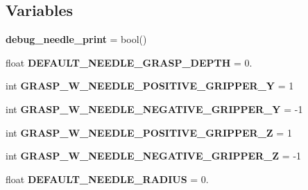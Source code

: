 \subsection*{Variables}
\begin{DoxyCompactItemize}
\item 
{\bfseries debug\+\_\+needle\+\_\+print} = bool(\textquotesingle{}\textquotesingle{})\hypertarget{namespaceneedle__planner__camera__working_ac4a4bbeda008998958ad58628672129e}{}\label{namespaceneedle__planner__camera__working_ac4a4bbeda008998958ad58628672129e}

\item 
float {\bfseries D\+E\+F\+A\+U\+L\+T\+\_\+\+N\+E\+E\+D\+L\+E\+\_\+\+G\+R\+A\+S\+P\+\_\+\+D\+E\+P\+TH} = 0.\hypertarget{namespaceneedle__planner__camera__working_ad7cf879208934ac313d29e98ba9e300e}{}\label{namespaceneedle__planner__camera__working_ad7cf879208934ac313d29e98ba9e300e}

\item 
int {\bfseries G\+R\+A\+S\+P\+\_\+\+W\+\_\+\+N\+E\+E\+D\+L\+E\+\_\+\+P\+O\+S\+I\+T\+I\+V\+E\+\_\+\+G\+R\+I\+P\+P\+E\+R\+\_\+Y} = 1\hypertarget{namespaceneedle__planner__camera__working_a82ed200a7602cd5a642ff337d8539ae8}{}\label{namespaceneedle__planner__camera__working_a82ed200a7602cd5a642ff337d8539ae8}

\item 
int {\bfseries G\+R\+A\+S\+P\+\_\+\+W\+\_\+\+N\+E\+E\+D\+L\+E\+\_\+\+N\+E\+G\+A\+T\+I\+V\+E\+\_\+\+G\+R\+I\+P\+P\+E\+R\+\_\+Y} = -\/1\hypertarget{namespaceneedle__planner__camera__working_a04874c13b30a30d19ddfa28aecc0f90b}{}\label{namespaceneedle__planner__camera__working_a04874c13b30a30d19ddfa28aecc0f90b}

\item 
int {\bfseries G\+R\+A\+S\+P\+\_\+\+W\+\_\+\+N\+E\+E\+D\+L\+E\+\_\+\+P\+O\+S\+I\+T\+I\+V\+E\+\_\+\+G\+R\+I\+P\+P\+E\+R\+\_\+Z} = 1\hypertarget{namespaceneedle__planner__camera__working_afcf30f247c7e7e20f1ed8c57afee3b5c}{}\label{namespaceneedle__planner__camera__working_afcf30f247c7e7e20f1ed8c57afee3b5c}

\item 
int {\bfseries G\+R\+A\+S\+P\+\_\+\+W\+\_\+\+N\+E\+E\+D\+L\+E\+\_\+\+N\+E\+G\+A\+T\+I\+V\+E\+\_\+\+G\+R\+I\+P\+P\+E\+R\+\_\+Z} = -\/1\hypertarget{namespaceneedle__planner__camera__working_a53fc3c8a5e921d3e0c2f6fe281d02c7c}{}\label{namespaceneedle__planner__camera__working_a53fc3c8a5e921d3e0c2f6fe281d02c7c}

\item 
float {\bfseries D\+E\+F\+A\+U\+L\+T\+\_\+\+N\+E\+E\+D\+L\+E\+\_\+\+R\+A\+D\+I\+US} = 0.\hypertarget{namespaceneedle__planner__camera__working_a3ca7c28d351d5ec2d911bda3bf8b0916}{}\label{namespaceneedle__planner__camera__working_a3ca7c28d351d5ec2d911bda3bf8b0916}


\end{DoxyCompactItemize}
